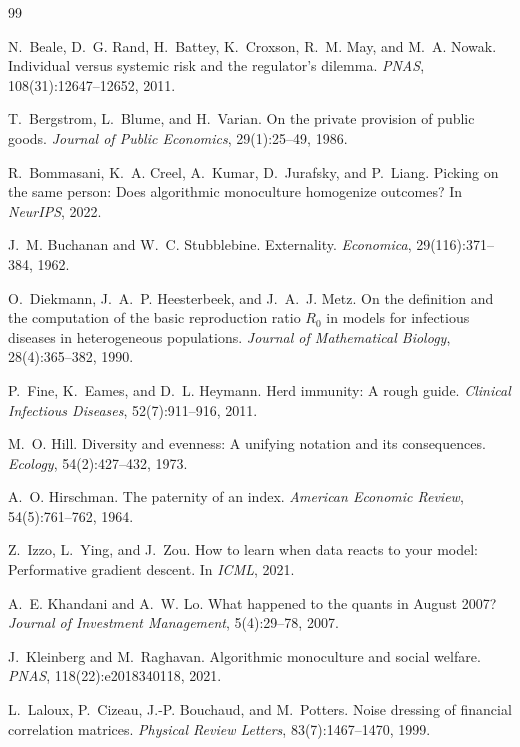 \documentclass{article}
\theoremstyle{plain}
\theoremstyle{definition}
\begin{document}
\begin{thebibliography}{99}
\small

 N.~Beale, D.~G. Rand, H.~Battey, K.~Croxson, R.~M. May, and M.~A. Nowak. Individual versus systemic risk and the regulator's dilemma. \emph{PNAS}, 108(31):12647--12652, 2011.

 T.~Bergstrom, L.~Blume, and H.~Varian. On the private provision of public goods. \emph{Journal of Public Economics}, 29(1):25--49, 1986.

 R.~Bommasani, K.~A. Creel, A.~Kumar, D.~Jurafsky, and P.~Liang. Picking on the same person: Does algorithmic monoculture homogenize outcomes? In \emph{NeurIPS}, 2022.

 J.~M. Buchanan and W.~C. Stubblebine. Externality. \emph{Economica}, 29(116):371--384, 1962.

 O.~Diekmann, J.~A.~P. Heesterbeek, and J.~A.~J. Metz. On the definition and the computation of the basic reproduction ratio $R_0$ in models for infectious diseases in heterogeneous populations. \emph{Journal of Mathematical Biology}, 28(4):365--382, 1990.

 P.~Fine, K.~Eames, and D.~L. Heymann. Herd immunity: A rough guide. \emph{Clinical Infectious Diseases}, 52(7):911--916, 2011.

 M.~O. Hill. Diversity and evenness: A unifying notation and its consequences. \emph{Ecology}, 54(2):427--432, 1973.

 A.~O. Hirschman. The paternity of an index. \emph{American Economic Review}, 54(5):761--762, 1964.

 Z.~Izzo, L.~Ying, and J.~Zou. How to learn when data reacts to your model: Performative gradient descent. In \emph{ICML}, 2021.

 A.~E. Khandani and A.~W. Lo. What happened to the quants in August 2007? \emph{Journal of Investment Management}, 5(4):29--78, 2007.

 J.~Kleinberg and M.~Raghavan. Algorithmic monoculture and social welfare. \emph{PNAS}, 118(22):e2018340118, 2021.

 L.~Laloux, P.~Cizeau, J.-P. Bouchaud, and M.~Potters. Noise dressing of financial correlation matrices. \emph{Physical Review Letters}, 83(7):1467--1470, 1999.


\end{thebibliography}
\end{document}
